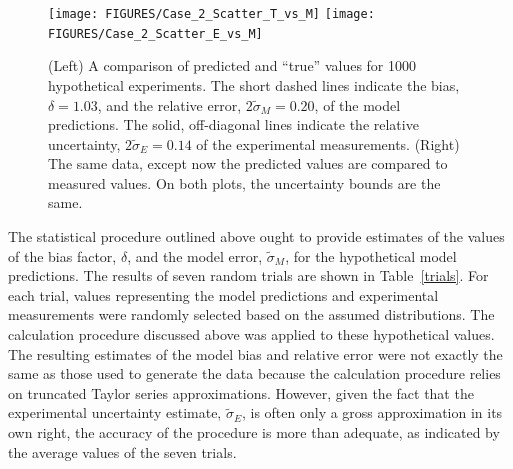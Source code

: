 \begin{figure}[t]
\begin{center}
\texttt{[image: FIGURES/Case\_2\_Scatter\_T\_vs\_M]}
\texttt{[image: FIGURES/Case\_2\_Scatter\_E\_vs\_M]}
\end{center}
\caption[Verification of the model error calculation, Case 2.]{(Left) A comparison of predicted and ``true'' values for 1000 hypothetical
experiments. The short dashed lines indicate the bias, $\delta=1.03$, and the relative error, $2\widetilde{\sigma}_M=0.20$, of the model predictions.
The solid, off-diagonal lines indicate the relative uncertainty, $2\widetilde{\sigma}_E=0.14$ of the experimental measurements.
(Right) The same data, except now the predicted values are compared to measured values. On both plots, the uncertainty bounds are the same.}
\label{Case_2_Scatter}
\end{figure}

The statistical procedure outlined above ought to provide estimates of the values of the bias factor, $\delta$, and the model error, $\widetilde{\sigma}_M$, for the
hypothetical model predictions. The results of seven random trials are shown in Table~\ref{trials}. For each trial, values representing the model 
predictions and experimental measurements were randomly selected based on the assumed distributions. The calculation procedure discussed above was applied to these
hypothetical values. The resulting estimates of the model bias and relative error were not exactly the same as those used to generate the data 
because the calculation procedure relies on truncated Taylor series approximations. 
However, given the fact that the experimental uncertainty estimate,
$\widetilde{\sigma}_E$, is often only a gross approximation in its own right, the accuracy of the procedure is more than adequate, as indicated by the average values
of the seven trials.

